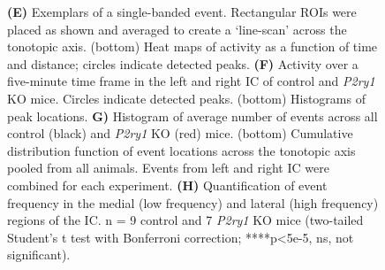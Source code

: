 \documentclass[9pt,lineno]{elife}
\begin{document}
\begin{figure}
\begin{fullwidth}
{\textbf{(E)} Exemplars of a single-banded event. Rectangular ROIs were placed as shown and averaged to create a `line-scan' across the tonotopic axis. (bottom) Heat maps of activity as a function of time and distance; circles indicate detected peaks.
\textbf{(F)} Activity over a five-minute time frame in the left and right IC of control and \textit{P2ry1} KO mice. Circles indicate detected peaks. (bottom) Histograms of peak locations.
\textbf{G)} Histogram of average number of events across all control (black) and \textit{P2ry1} KO (red) mice. (bottom) Cumulative distribution function of event locations across the tonotopic axis pooled from all animals. Events from left and right IC were combined for each experiment.
\textbf{(H)} Quantification of event frequency in the medial (low frequency) and lateral (high frequency) regions of the IC. n = 9 control and 7 \textit{P2ry1} KO mice (two-tailed Student's t test with Bonferroni correction; ****p<5e-5, ns, not significant).}
\label{fig:f7}
\label{figsupp:sf7p1}
\end{fullwidth}
\end{figure}
\end{document}

